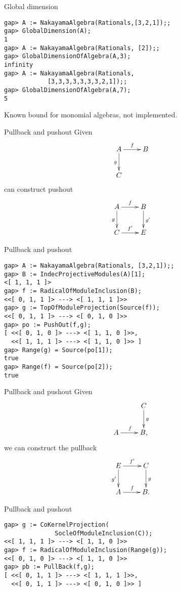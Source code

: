 \begin{frame}[fragile]{Global dimension}
\begin{verbatim}
gap> A := NakayamaAlgebra(Rationals,[3,2,1]);;
gap> GlobalDimension(A);
1
gap> A := NakayamaAlgebra(Rationals, [2]);;
gap> GlobalDimensionOfAlgebra(A,3);
infinity
gap> A := NakayamaAlgebra(Rationals,
            [3,3,3,3,3,3,3,2,1]);;
gap> GlobalDimensionOfAlgebra(A,7);
5
\end{verbatim}
Known bound for monomial algebras, not implemented. 
\end{frame}

\begin{frame}[fragile]{Pullback and pushout}
Given
\[\vcenter{\xymatrix{A\ar[r]^f\ar[d]_g & B\\ C & }}\]
can construct pushout
\[\xymatrix{A\ar[r]^f\ar[d]_g & B\ar[d]^{g'}\\ C\ar[r]^{f'} & E}\]
\end{frame}

\begin{frame}[fragile]{Pullback and pushout}
\begin{verbatim}
gap> A := NakayamaAlgebra(Rationals, [3,2,1]);;                       
gap> B := IndecProjectiveModules(A)[1];
<[ 1, 1, 1 ]>
gap> f := RadicalOfModuleInclusion(B);
<<[ 0, 1, 1 ]> ---> <[ 1, 1, 1 ]>>
gap> g := TopOfModuleProjection(Source(f));
<<[ 0, 1, 1 ]> ---> <[ 0, 1, 0 ]>>
gap> po := PushOut(f,g);
[ <<[ 0, 1, 0 ]> ---> <[ 1, 1, 0 ]>>,
  <<[ 1, 1, 1 ]> ---> <[ 1, 1, 0 ]>> ]
gap> Range(g) = Source(po[1]);
true
gap> Range(f) = Source(po[2]);
true
\end{verbatim}
\end{frame}

\begin{frame}[fragile]{Pullback and pushout}
Given
\[\vcenter{\xymatrix{ & C\ar[d]^g\\  A\ar[r]^f & B,}}\]
we can construct the pullback 
\[\xymatrix{E\ar[r]^{f'}\ar[d]_{g'} & C\ar[d]^g\\ A\ar[r]^f & B.}\]
\end{frame}

\begin{frame}[fragile]{Pullback and pushout}

\begin{verbatim}
gap> g := CoKernelProjection(
              SocleOfModuleInclusion(C));
<<[ 1, 1, 1 ]> ---> <[ 1, 1, 0 ]>>
gap> f := RadicalOfModuleInclusion(Range(g));
<<[ 0, 1, 0 ]> ---> <[ 1, 1, 0 ]>>
gap> pb := PullBack(f,g);
[ <<[ 0, 1, 1 ]> ---> <[ 1, 1, 1 ]>>,
  <<[ 0, 1, 1 ]> ---> <[ 0, 1, 0 ]>> ]
\end{verbatim}
\end{frame}

